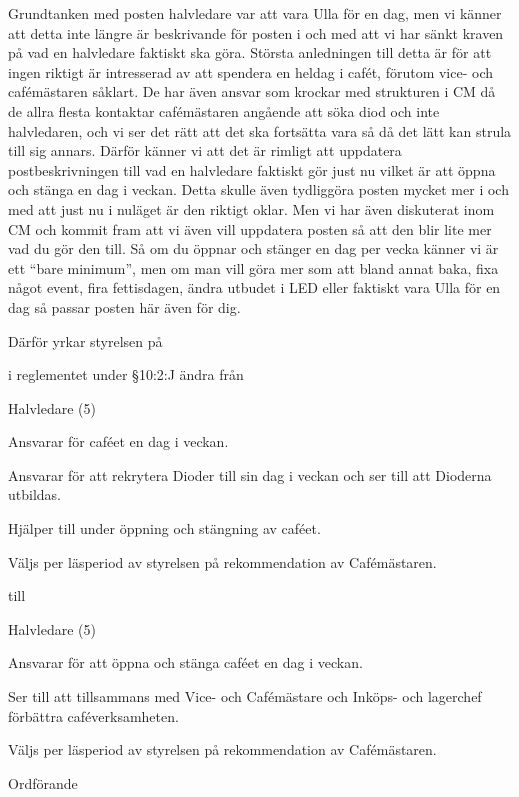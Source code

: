 \documentclass[../_main/handlingar.tex]{subfiles}
\begin{document}

Grundtanken med posten halvledare var att vara Ulla för en dag, men vi känner att detta inte längre är beskrivande för posten i och med att vi har sänkt kraven på vad en halvledare faktiskt ska göra. 
Största anledningen till detta är för att ingen riktigt är intresserad av att spendera en heldag i cafét, förutom vice- och cafémästaren såklart. 
De har även ansvar som krockar med strukturen i CM då de allra flesta kontaktar cafémästaren angående att söka diod och inte halvledaren, och vi ser det rätt att det ska fortsätta vara så då det lätt kan strula till sig annars. 
Därför känner vi att det är rimligt att uppdatera postbeskrivningen till vad en halvledare faktiskt gör just nu vilket är att öppna och stänga en dag i veckan. 
Detta skulle även tydliggöra posten mycket mer i och med att just nu i nuläget är den riktigt oklar. Men vi har även diskuterat inom CM och kommit fram att vi även vill uppdatera posten så att den blir lite mer vad du gör den till. 
Så om du öppnar och stänger en dag per vecka känner vi är ett “bare minimum”, men om man vill göra mer som att bland annat baka, fixa något event, fira fettisdagen, ändra utbudet i LED eller faktiskt vara Ulla för en dag så passar posten här även för dig.

Därför yrkar styrelsen på

\begin{attsatser}
    \att i reglementet under \S10:2:J ändra från
    \begin{emptylist}
        \item Halvledare (5)
        \begin{dashlist}
            \item Ansvarar för caféet en dag i veckan. 
            \item Ansvarar för att rekrytera Dioder till sin dag i veckan och ser till att Dioderna utbildas.
            \item Hjälper till under öppning och stängning av caféet.
            \item Väljs per läsperiod av styrelsen på rekommendation av Cafémästaren.
        \end{dashlist}
    \end{emptylist}

    till

    \begin{emptylist}
        \item Halvledare (5)
        \begin{dashlist}
            \item Ansvarar för att öppna och stänga caféet en dag i veckan.
            \item Ser till att tillsammans med Vice- och Cafémästare och Inköps- och lagerchef förbättra caféverksamheten.
            \item Väljs per läsperiod av styrelsen på rekommendation av Cafémästaren.
        \end{dashlist}
    \end{emptylist}

\end{attsatser}

\begin{signatures}{1}
    \ist
    \signature{\ordf}{Ordförande}
\end{signatures}
\end{document}
